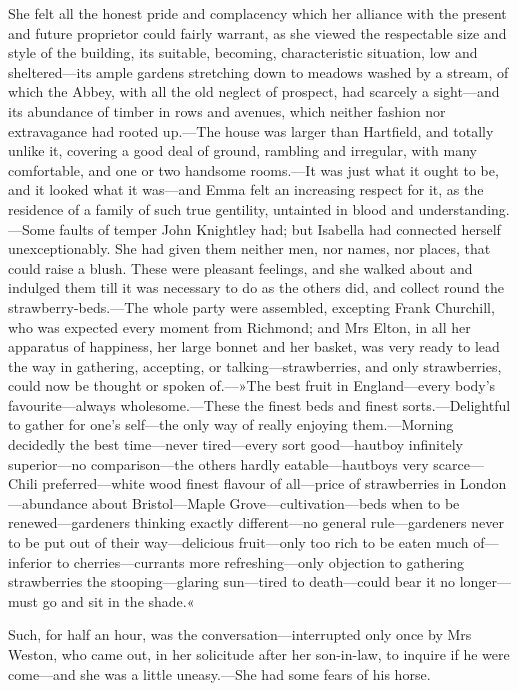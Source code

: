 She felt all the honest pride and complacency which her alliance with the present and future proprietor could fairly warrant, as she viewed the respectable size and style of the building, its suitable, becoming, characteristic situation, low and sheltered—its ample gardens stretching down to meadows washed by a stream, of which the Abbey, with all the old neglect of prospect, had scarcely a sight—and its abundance of timber in rows and avenues, which neither fashion nor extravagance had rooted up.—The house was larger than Hartfield, and totally unlike it, covering a good deal of ground, rambling and irregular, with many comfortable, and one or two handsome rooms.—It was just what it ought to be, and it looked what it was—and Emma felt an increasing respect for it, as the residence of a family of such true gentility, untainted in blood and understanding.—Some faults of temper John Knightley had; but Isabella had connected herself unexceptionably. She had given them neither men, nor names, nor places, that could raise a blush. These were pleasant feelings, and she walked about and indulged them till it was necessary to do as the others did, and collect round the strawberry-beds.—The whole party were assembled, excepting Frank Churchill, who was expected every moment from Richmond; and Mrs Elton, in all her apparatus of happiness, her large bonnet and her basket, was very ready to lead the way in gathering, accepting, or talking—strawberries, and only strawberries, could now be thought or spoken of.—»The best fruit in England—every body's favourite—always wholesome.—These the finest beds and finest sorts.—Delightful to gather for one's self—the only way of really enjoying them.—Morning decidedly the best time—never tired—every sort good—hautboy infinitely superior—no comparison—the others hardly eatable—hautboys very scarce—Chili preferred—white wood finest flavour of all—price of strawberries in London—abundance about Bristol—Maple Grove—cultivation—beds when to be renewed—gardeners thinking exactly different—no general rule—gardeners never to be put out of their way—delicious fruit—only too rich to be eaten much of—inferior to cherries—currants more refreshing—only objection to gathering strawberries the stooping—glaring sun—tired to death—could bear it no longer—must go and sit in the shade.«

Such, for half an hour, was the conversation—interrupted only once by Mrs Weston, who came out, in her solicitude after her son-in-law, to inquire if he were come—and she was a little uneasy.—She had some fears of his horse.

